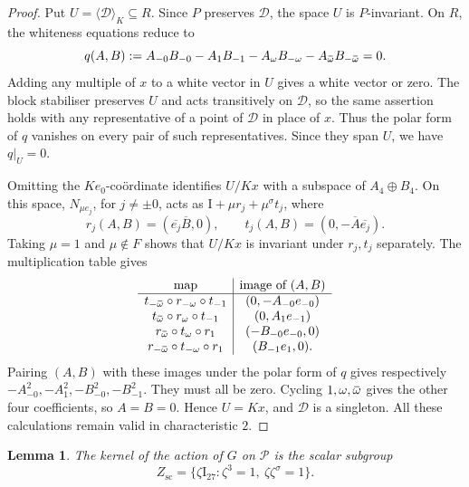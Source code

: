 \documentclass{amsart}
\def\ombb{\mathord{\mbox{\hspace*{0pt}}\;\!\overline{\!\!\:\omega\!\!\:}\;\!}\mbox{\hspace*{0pt}}}
\def\II{\mathord{\mathrm{I}}}
\renewcommand{\bar}{\overline}
\newcommand{\s}{\sigma}
\theoremstyle{plain}
\numberwithin{theorem}{section}
\newtheorem{lemma}[theorem]{Lemma}
\theoremstyle{definition}
\begin{document}
\begin{proof}
    Put $U=\langle\mathcal D\rangle_K\subseteq R$.
    Since $P$ preserves $\mathcal D$, the space $U$ is $P$-invariant.
    On $R$, the whiteness equations reduce to
    \[
        q(A,B):=A_{-0}B_{-0}-A_1B_{-1}
                 -A_\omega B_{-\omega}-A_{\ombb}B_{-\ombb}=0.
    \]
    Adding any multiple of $x$ to a white vector in $U$ gives a white
    vector or zero. The block stabiliser preserves $U$ and acts
    transitively on $\mathcal D$, so the same assertion holds with
    any representative of a point of $\mathcal D$ in place of $x$.
    Thus the polar form of $q$ vanishes on every pair of such
    representatives. Since they span $U$, we have $q|_U=0$.

    Omitting the $Ke_0$-co\"ordinate identifies $U/Kx$ with a subspace
    of $A_4\oplus B_4$. On this space, $N_{\mu e_j}$, for $j\neq\pm0$,
    acts as $\II+\mu r_j+\mu^\s t_j$, where
    \[
        r_j(A,B)=(\overline{e_j}\bar B,0),\qquad
        t_j(A,B)=(0,-\bar A\overline{e_j}).
    \]
    Taking $\mu=1$ and $\mu\notin F$ shows that $U/Kx$ is invariant
    under $r_j,t_j$ separately. The multiplication table gives
    \[
    \begin{array}{c|c}
        \text{map}&\text{image of }(A,B)\\ \hline
        t_{-\ombb}\circ r_{-\omega}\circ t_{-1}
            &(0,-A_{-0}e_{-0})\\
        t_{\ombb}\circ r_\omega\circ t_{-1}
            &(0,A_1e_{-1})\\
        r_{\ombb}\circ t_\omega\circ r_1
            &(-B_{-0}e_{-0},0)\\
        r_{-\ombb}\circ t_{-\omega}\circ r_1
            &(B_{-1}e_1,0).
    \end{array}
    \]
    Pairing $(A,B)$ with these images under the polar form of $q$
    gives respectively $-A_{-0}^2,-A_1^2,-B_{-0}^2,-B_{-1}^2$.
    They must all be zero. Cycling $1,\omega,\ombb$ gives the other
    four coefficients, so $A=B=0$. Hence $U=Kx$, and $\mathcal D$
    is a singleton. All these calculations remain valid in characteristic $2$.
\end{proof}

\begin{lemma}
    \label{lemma:simplicity_kernel}
    The kernel of the action of $G$ on $\mathcal P$ is the scalar subgroup
    \[
        Z_{\mathrm{sc}}=\{\zeta\II_{27}:\zeta^3=1,\ \zeta\zeta^\s=1\}.
    \]
\end{lemma}
\end{document}
